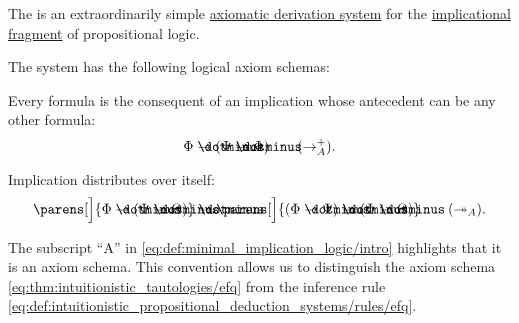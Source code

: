 \begin{definition}\label{def:minimal_implication_logic}
  The  is an extraordinarily simple \hyperref[def:axiomatic_derivation_system]{axiomatic derivation system} for the \hyperref[def:implicational_propositional_fragment]{implicational fragment} of propositional logic.

  The system has the following logical axiom schemas:
  \begin{thmenum}
     Every formula is the consequent of an implication whose antecedent can be any other formula:
    \begin{equation}\label{eq:def:minimal_implication_logic/intro}
      \Phi \synimplies (\Psi \synimplies \Phi) \tag{\( \rightarrow_A^+ \)}.
    \end{equation}

     Implication distributes over itself:
    \begin{equation}\label{eq:def:minimal_implication_logic/dist}
      \parens[\Big]{ \Phi \synimplies (\Psi \synimplies \Theta) } \synimplies \parens[\Big]{ (\Phi \synimplies \Psi) \synimplies (\Phi \synimplies \Theta)} \tag{\( \twoheadrightarrow_A \)}.
    \end{equation}
  \end{thmenum}
\end{definition}
\begin{comments}
  \item The subscript \enquote{A} in \eqref{eq:def:minimal_implication_logic/intro} highlights that it is an axiom schema. This convention allows us to distinguish the axiom schema \eqref{eq:thm:intuitionistic_tautologies/efq} from the inference rule \eqref{eq:def:intuitionistic_propositional_deduction_systems/rules/efq}.
\end{comments}


